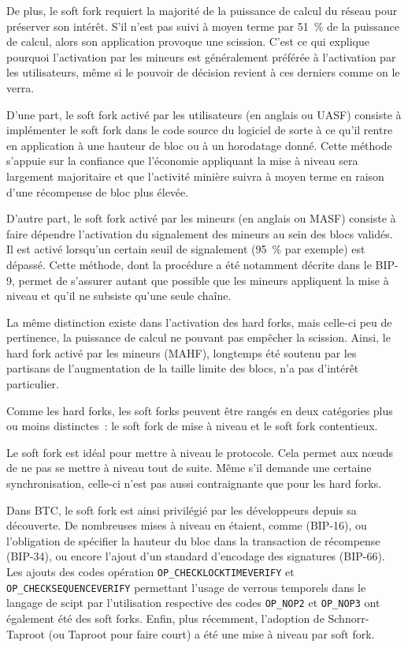 De plus, le soft fork requiert la majorité de la puissance de calcul du réseau pour préserver son intérêt. S'il n'est pas suivi à moyen terme par 51~\% de la puissance de calcul, alors son application provoque une scission. C'est ce qui explique pourquoi l'activation par les mineurs est généralement préférée à l'activation par les utilisateurs, même si le pouvoir de décision revient à ces derniers comme on le verra.

D'une part, le soft fork activé par les utilisateurs (en anglais  ou UASF) consiste à implémenter le soft fork dans le code source du logiciel de sorte à ce qu'il rentre en application à une hauteur de bloc ou à un horodatage donné. Cette méthode s'appuie sur la confiance que l'économie appliquant la mise à niveau sera largement majoritaire et que l'activité minière suivra à moyen terme en raison d'une récompense de bloc plus élevée.

D'autre part, le soft fork activé par les mineurs (en anglais  ou MASF) consiste à faire dépendre l'activation du signalement des mineurs au sein des blocs validés. Il est activé lorsqu'un certain seuil de signalement (95~\% par exemple) est dépassé. Cette méthode, dont la procédure a été notamment décrite dans le BIP-9, permet de s'assurer autant que possible que les mineurs appliquent la mise à niveau et qu'il ne subsiste qu'une seule chaîne.

La même distinction existe dans l'activation des hard forks, mais celle-ci peu de pertinence, la puissance de calcul ne pouvant pas empêcher la scission. Ainsi, le hard fork activé par les mineurs (MAHF), longtemps été soutenu par les partisans de l'augmentation de la taille limite des blocs, n'a pas d'intérêt particulier.

Comme les hard forks, les soft forks peuvent être rangés en deux catégories plus ou moins distinctes~: le soft fork de mise à niveau et le soft fork contentieux.

Le soft fork est idéal pour mettre à niveau le protocole. Cela permet aux nœuds de ne pas se mettre à niveau tout de suite. Même s'il demande une certaine synchronisation, celle-ci n'est pas aussi contraignante que pour les hard forks.

Dans BTC, le soft fork est ainsi privilégié par les développeurs depuis sa découverte. De nombreuses mises à niveau en étaient, comme  (BIP-16), ou l'obligation de spécifier la hauteur du bloc dans la transaction de récompense (BIP-34), ou encore l'ajout d'un standard d'encodage des signatures (BIP-66). Les ajouts des codes opération \texttt{OP\_CHECKLOCKTIMEVERIFY} et \texttt{OP\_CHECKSEQUENCEVERIFY} permettant l'usage de verrous temporels dans le langage de scipt par l'utilisation respective des codes \texttt{OP\_NOP2} et \texttt{OP\_NOP3} ont également été des soft forks. Enfin, plus récemment, l'adoption de Schnorr-Taproot (ou Taproot pour faire court) a été une mise à niveau par soft fork.

